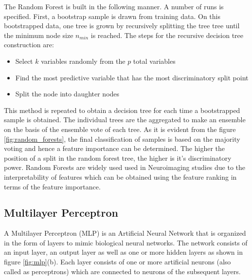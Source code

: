 \documentclass[msthesis.tex]{subfiles}
\begin{document}
The Random Forest is built in the following manner. A number of runs is specified. First, a bootstrap sample is drawn from training data. On this bootstrapped data, one tree is grown by recursively splitting the tree tree until the minimum node size $n_{min}$ is reached. The steps for the recursive decision tree construction are:
\begin{itemize}
    \item Select $k$ variables randomly from the $p$ total variables
    \item Find the most predictive variable that has the most discriminatory split point
    \item Split the node into daughter nodes

\end{itemize}
This method is repeated to obtain a decision tree for each time a bootstrapped sample is obtained. The individual trees are the aggregated to make an ensemble on the basis of the ensemble vote of each tree. As it is evident from the figure \autoref{fig:random_forests}, the final classification of samples is based on the majority voting and hence a feature importance can be determined. The higher the position of a split in the random forest tree, the higher is it's discriminatory power. Random Forests are widely used used in Neuroimaging studies due to the interpretability of features which can be obtained using the feature ranking in terms of the feature importance. 



\subsection{Multilayer Perceptron}
A Multilayer Perceptron (MLP) is an Artificial Neural Network that is organized in the form of layers to mimic biological neural networks. The network consists of an input layer, an output layer as well as one or more hidden layers as shown in figure \autoref{fig:mlp}(b). Each layer consists of one or more artificial neurons (also called as perceptrons) which are connected to neurons of the subsequent layers. 
\end{document}
